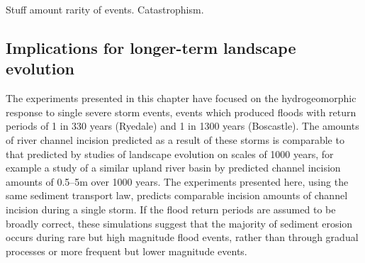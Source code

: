Stuff amount rarity of events. Catastrophism.

\subsection{Implications for longer-term landscape evolution}
The experiments presented in this chapter have focused on the hydrogeomorphic response to single severe storm events, events which produced floods with return periods of 1 in 330 years (Ryedale) and 1 in 1300 years (Boscastle). The amounts of river channel incision predicted as a result of these storms is comparable to that predicted by studies of landscape evolution on scales of 1000 years, for example a study of a similar upland river basin by \citep{coulthard2016sensitivity} predicted channel incision amounts of 0.5--5m over 1000 years. The experiments presented here, using the same sediment transport law, predicts comparable incision amounts of channel incision during a single storm. If the flood return periods are assumed to be broadly correct, these simulations suggest that the majority of sediment erosion occurs during rare but high magnitude flood events, rather than through gradual processes or more frequent but lower magnitude events.









